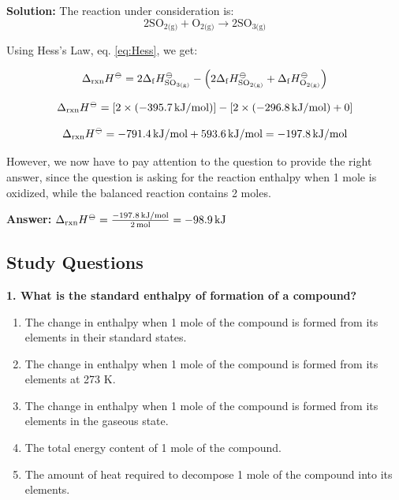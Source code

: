 \documentclass[
  9pt,
]{extbook}
\providecommand{\tightlist}{%
  \setlength{\itemsep}{0pt}\setlength{\parskip}{0pt}}
\theoremstyle{definition}
\theoremstyle{definition}
\theoremstyle{definition}
\theoremstyle{remark}
\begin{document}
\textbf{Solution:} The reaction under consideration is:
\[2\text{SO}_{2\text{(g)}}+ \text{O}_{2\text{(g)}} \rightarrow 2 \text{SO}_{3\text{(g)}}\]

Using Hess's Law, eq. \eqref{eq:Hess}, we get:

\[\Delta_{\text{rxn}} H^{-\kern-6pt{\ominus}\kern-6pt-}= 2 \Delta_{\mathrm{f}} H_{\text{SO}_{3\text{(g)}}}^{-\kern-6pt{\ominus}\kern-6pt-}- \left(2\Delta_{\mathrm{f}} H_{\text{SO}_{2\text{(g)}}}^{-\kern-6pt{\ominus}\kern-6pt-}+\Delta_{\mathrm{f}} H_{\text{O}_{2\text{(g)}}}^{-\kern-6pt{\ominus}\kern-6pt-}\right)\]

\[\Delta_{\text{rxn}} H^{-\kern-6pt{\ominus}\kern-6pt-}= \left[2 \times \left(-395.7 \, \text{kJ/mol}\right)\right] - \left[2 \times \left(-296.8 \, \text{kJ/mol}\right) + 0\right]\]

\[\Delta_{\text{rxn}} H^{-\kern-6pt{\ominus}\kern-6pt-}= -791.4 \, \text{kJ/mol} + 593.6 \, \text{kJ/mol} = -197.8 \, \text{kJ/mol}\]

However, we now have to pay attention to the question to provide the right answer, since the question is asking for the reaction enthalpy when 1 mole is oxidized, while the balanced reaction contains 2 moles.

\textbf{Answer:} \(\Delta_{\text{rxn}} H^{-\kern-6pt{\ominus}\kern-6pt-}= \frac{-197.8 \, \text{kJ/mol}}{2\,\text{mol}} = -98.9 \, \text{kJ}\)

\hypertarget{quest4}{%
\subsection{Study Questions}\label{quest4}}

\textbf{1. What is the standard enthalpy of formation of a compound?}

\begin{enumerate}
\def\labelenumi{\alph{enumi}.}
\tightlist
\item
  The change in enthalpy when 1 mole of the compound is formed from its elements in their standard states.
\item
  The change in enthalpy when 1 mole of the compound is formed from its elements at 273 K.
\item
  The change in enthalpy when 1 mole of the compound is formed from its elements in the gaseous state.
\item
  The total energy content of 1 mole of the compound.
\item
  The amount of heat required to decompose 1 mole of the compound into its elements.
\end{enumerate}
\end{document}

